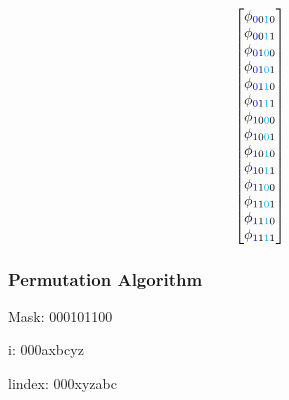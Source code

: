 \documentclass{beamer}
\begin{document}
\begin{frame}
\begin{footnotesize}
\begin{equation}
\begin{bmatrix}
      \phi_{{\color{blue}0}0{\color{cyan}1}0}  \\
      \phi_{{\color{blue}0}0{\color{cyan}1}1} \\
      \phi_{{\color{blue}0}1{\color{cyan}0}0} \\
      \phi_{{\color{blue}0}1{\color{cyan}0}1} \\
      \phi_{{\color{blue}0}1{\color{cyan}1}0}  \\
      \phi_{{\color{blue}0}1{\color{cyan}1}1} \\
      \phi_{{\color{blue}1}0{\color{cyan}0}0} \\
      \phi_{{\color{blue}1}0{\color{cyan}0}1} \\
      \phi_{{\color{blue}1}0{\color{cyan}1}0}  \\
      \phi_{{\color{blue}1}0{\color{cyan}1}1} \\
      \phi_{{\color{blue}1}1{\color{cyan}0}0} \\
      \phi_{{\color{blue}1}1{\color{cyan}0}1} \\
      \phi_{{\color{blue}1}1{\color{cyan}1}0}  \\
      \phi_{{\color{blue}1}1{\color{cyan}1}1} \\
    \end{bmatrix} 
\end{equation}
\end{footnotesize}

\end{frame}

\begin{frame}
 \frametitle{Permutation Algorithm}
 Mask: 000{\color{red}1}0{\color{red}11}00
 
 i: 000{\color{red}a}{\color{blue}x}{\color{red}bc}{\color{blue}yz}
 
 lindex: 000{\color{blue}xyz}{\color{red}abc}

 

\end{frame}
\end{document}
